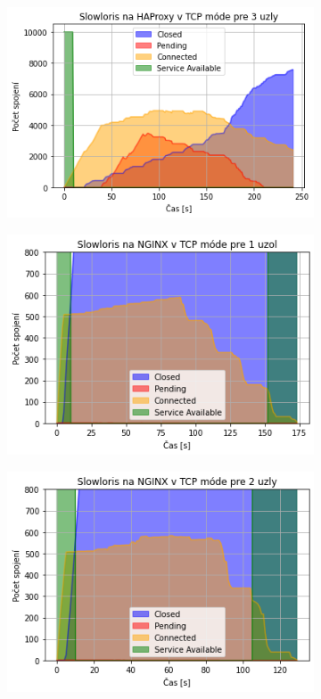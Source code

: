 \documentclass[12pt, a4paper]{article}
\begin{document}
\begin{figure}[h!]
\begin{subfigure}[t]{.32\textwidth}
	\end{subfigure}
	\begin{subfigure}[t]{.32\textwidth}
  		\centering
  		\includegraphics[width=\textwidth]{images/haproxy-3-tcp.png}
	\end{subfigure}
	\begin{subfigure}[t]{.32\textwidth}
  		\centering
  		\includegraphics[width=\textwidth]{images/nginx-1-tcp.png}
	\end{subfigure}
	\begin{subfigure}[t]{.32\textwidth}
  		\centering
  		\includegraphics[width=\textwidth]{images/nginx-2-tcp.png}

\end{subfigure}
\end{figure}
\end{document}
